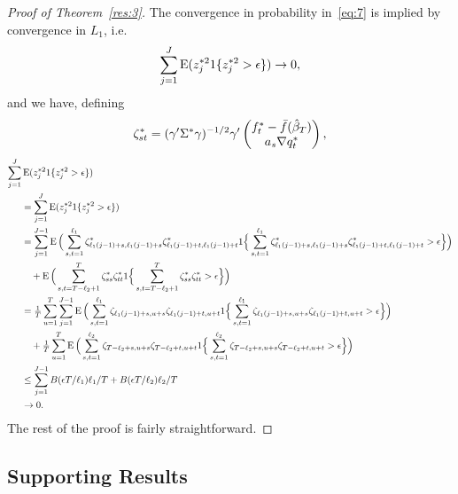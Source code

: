 \documentclass[12pt,fleqn]{article}
\begin{document}
\begin{proof}[Proof of Theorem~\ref{res:3}]
   The convergence in probability in~\eqref{eq:7} is implied by
   convergence in $L_1$, i.e.
   \begin{equation*}
     \sum_{j=1}^J \operatorname{E}(z_j^{*2} 1\{z_j^{*2} > \epsilon\}) \to 0,
   \end{equation*}
   and we have, defining
   \begin{equation*}
     \zeta_{st}^* =
     (\gamma'\Sigma^*\gamma)^{-1/2} \gamma'\begin{pmatrix}
       f_t^* - \fb(\btrue[*]) \\
       a_s \nabla q_t^*
     \end{pmatrix},
   \end{equation*}
   \begin{align*}
     \sum_{j=1}^J &\operatorname{E}(z_j^{*2} 1\{z_j^{*2} > \epsilon\}) \\
     &= \sum_{j=1}^J \operatorname{E}(z_j^{*2} 1\{z_j^{*2} > \epsilon\}) \\
     &= \sum_{j=1}^{J-1} \operatorname{E}\Big(\sum_{s,t =1}^{\ell_1} \zeta^*_{\ell_1 (j-1)+s,\ell_1 (j-1)+s}\zeta^*_{\ell_1 (j-1)+t,\ell_1 (j-1)+t}
     1\Big\{ \sum_{s,t = 1}^{\ell_1} \zeta^*_{\ell_1 (j-1)+s,\ell_1 (j-1)+s}\zeta^*_{\ell_1 (j-1)+t,\ell_1 (j-1)+t} > \epsilon\Big\}\Big) \\
     &\quad +
     \operatorname{E}\Big(\sum_{s,t = T-\ell_2+1}^{T} \zeta^*_{ss}\zeta^*_{tt} 1\Big\{\sum_{s,t = T - \ell_2+1}^{T} \zeta^*_{ss}\zeta^*_{tt} > \epsilon\Big\}\Big) \\
     &= \tfrac{1}{T} \sum_{u=1}^T \sum_{j=1}^{J-1} \operatorname{E}\Big(\sum_{s,t = 1}^{\ell_1} \zeta_{\ell_1(j-1) + s,u+s}\zeta_{\ell_1(j-1) + t,u+t}
     1\Big\{\sum_{s,t = 1}^{\ell_1} \zeta_{\ell_1(j-1) + s,u+s}\zeta_{\ell_1(j-1) + t,u+t} > \epsilon\Big\}\Big) \\
     &\quad +
     \tfrac{1}{T} \sum_{u=1}^T \operatorname{E}\Big(\sum_{s,t = 1}^{\ell_2} \zeta_{T-\ell_2 + s,u+s}\zeta_{T-\ell_2+t,u+t}
     1\Big\{\sum_{s,t = 1}^{\ell_2} \zeta_{T-\ell_2 + s,u+s}\zeta_{T-\ell_2+t,u+t} > \epsilon\Big\}\Big) \\
     &\leq \sum_{j=1}^{J-1} B(\epsilon T / \ell_1) \ell_1 / T
     + B(\epsilon T / \ell_2) \ell_2/T \\
     &\to 0.
   \end{align*}
   The rest of the proof is fairly straightforward.
\end{proof}

\subsection{Supporting Results}
\end{document}
